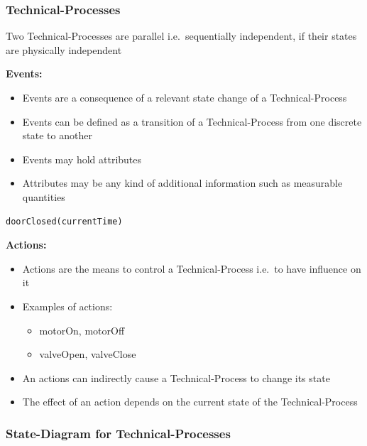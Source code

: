 \hypertarget{technical-processes}{%
\subsubsection{Technical-Processes}\label{technical-processes}}

\begin{tcolorbox}[colback=red!5!white,colframe=red!75!black]
Two Technical-Processes are parallel i.e.~sequentially independent, if their states are physically independent
\end{tcolorbox}

\textbf{Events:} 
\begin{itemize}
    \item Events are a consequence of a relevant state change of a Technical-Process
    \item Events can be defined as a transition of a Technical-Process from one discrete state to another
    \item Events may hold attributes
    \item Attributes may be any kind of additional information such as measurable quantities
\end{itemize}

\begin{lstlisting}
doorClosed(currentTime)
\end{lstlisting}


\textbf{Actions:} 
\begin{itemize}
    \item Actions are the means to control a Technical-Process i.e.~to have influence on it
    \item Examples of actions:
    \begin{itemize}
        \item motorOn, motorOff
        \item valveOpen, valveClose
    \end{itemize}
    \item An actions can indirectly cause a Technical-Process to change its state
    \item The effect of an action depends on the current state of the Technical-Process
\end{itemize}

\hypertarget{state-diagram-for-technical-processes}{%
\subsubsection{State-Diagram for
Technical-Processes}\label{state-diagram-for-technical-processes}}

